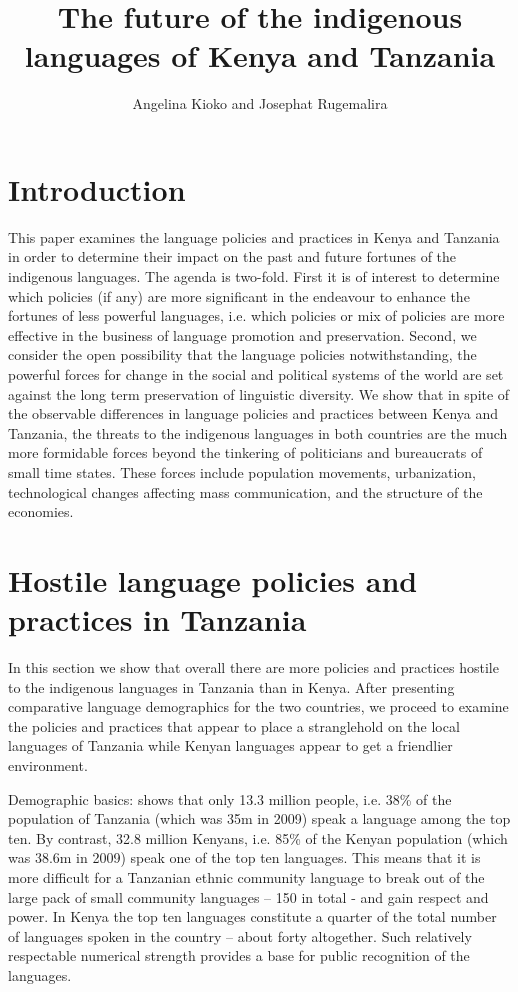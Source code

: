 \documentclass[output=paper,colorlinks,citecolor=brown]{langscibook}
\author{Angelina Kioko\affiliation{US International University-Africa} and Josephat Rugemalira \affiliation{Tumaini University College Dar es Salaam}}
\title{The future of the indigenous languages of Kenya and Tanzania}
\begin{document}
\maketitle
{}

\section{Introduction}\label{sec:kioko:1}

This paper examines the language policies and practices in Kenya and Tanzania in order to determine their impact on the past and future fortunes of the indigenous languages. The agenda is two-fold. First it is of interest to determine which policies (if any) are more significant in the endeavour to enhance the fortunes of less powerful languages, i.e. which policies or mix of policies are more effective in the business of language promotion and preservation. Second, we consider the open possibility that the language policies notwithstanding, the powerful forces for change in the social and political systems of the world are set against the long term preservation of linguistic diversity. We show that in spite of the observable differences in language policies and practices between Kenya and Tanzania, the threats to the indigenous languages in both countries are the much more formidable forces beyond the tinkering of politicians and bureaucrats of small time states. These forces include population movements, urbanization, technological changes affecting mass communication, and the structure of the economies.

\section{Hostile language policies and practices in Tanzania}\label{sec:kioko:2}

In this section we show that overall there are more policies and practices hostile to the indigenous languages in Tanzania than in Kenya. After presenting comparative language demographics for the two countries, we proceed to examine the policies and practices that appear to place a stranglehold on the local languages of Tanzania while Kenyan languages appear to get a friendlier environment.

Demographic basics:  shows that only 13.3 million people, i.e. 38\% of the population of Tanzania (which was 35m in 2009) speak a language among the top ten. By contrast, 32.8 million Kenyans, i.e.  85\% of the Kenyan population (which was 38.6m in 2009) speak one of the top ten languages. This means that it is more difficult for a Tanzanian ethnic community language to break out of the large pack of small community languages – 150 in total - and gain respect and power. In Kenya the top ten languages constitute a quarter of the total number of languages spoken in the country – about forty altogether. Such relatively respectable numerical strength provides a base for public recognition of the languages.
\end{document}
